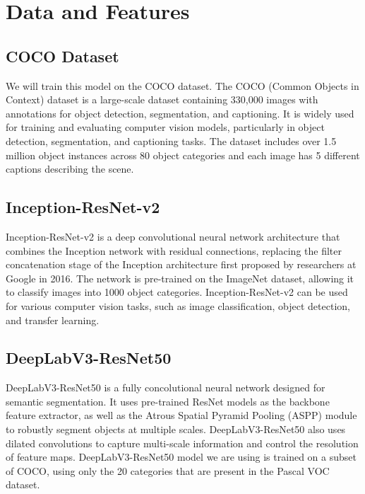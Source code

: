 \documentclass[10pt,twocolumn,letterpaper]{article}
\begin{document}

\section{Data and Features}
\subsection{COCO Dataset}
We will train this model on the COCO dataset. The COCO (Common Objects in Context) dataset is a large-scale dataset containing  330,000 images with annotations for object detection, segmentation, and captioning. It is widely used for training and evaluating computer vision models, particularly in object detection, segmentation, and captioning tasks. The dataset includes over 1.5 million object instances across 80 object categories and each image has 5 different captions describing the scene.

\subsection{Inception-ResNet-v2}
Inception-ResNet-v2 is a deep convolutional neural network architecture that combines the Inception network with residual connections, replacing the filter concatenation stage of the Inception architecture first proposed by researchers at Google in 2016. The network is pre-trained on the ImageNet dataset, allowing it to classify images into 1000 object categories. Inception-ResNet-v2 can be used for various computer vision tasks, such as image classification, object detection, and transfer learning.

\subsection{DeepLabV3-ResNet50}
DeepLabV3-ResNet50 is a fully concolutional neural network designed for semantic segmentation. It uses pre-trained ResNet models as the backbone feature extractor,  as well as the Atrous Spatial Pyramid Pooling (ASPP) module to robustly segment objects at multiple scales. DeepLabV3-ResNet50 also uses dilated convolutions to capture multi-scale information and control the resolution of feature maps. DeepLabV3-ResNet50 model we are using is trained on a subset of COCO, using only the 20 categories that are present in the Pascal VOC dataset.
\end{document}
